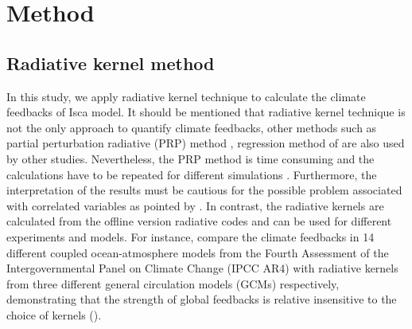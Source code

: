 \section{Method} \label{sec:method_radiative_kernel}

\subsection{Radiative kernel method}
In this study, we apply radiative kernel  technique \citep{Soden2008,Shell2008} to calculate the climate feedbacks of Isca model. It should be mentioned that radiative kernel technique is not the only approach to quantify climate feedbacks, other methods such as partial perturbation radiative (PRP)  method \citep{Wetherald1988}, regression method of \cite{Gregory2004} are also used by other studies. Nevertheless, the PRP method is time consuming and the calculations have to be repeated for different simulations \citep{Shell2008}. Furthermore, the interpretation of the results must be cautious for the possible problem associated with correlated variables as pointed by \cite{Bony2006}.  In contrast, the radiative kernels are calculated from the offline version radiative codes and can be used for different experiments and models. For instance, \cite{Soden2008} compare the climate feedbacks in 14 different coupled ocean-atmosphere models from the Fourth Assessment of the Intergovernmental Panel on Climate Change (IPCC AR4) with radiative kernels from three different general circulation models (GCMs) respectively, demonstrating that the strength of global feedbacks is relative insensitive to the choice of kernels ().

